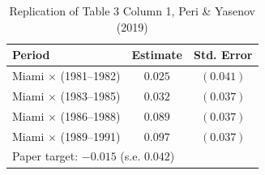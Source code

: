 \begin{table}[h]
\centering
\caption{Replication of Table 3 Column 1, Peri \& Yasenov (2019)}
\begin{tabular}{lcc}
\hline
Period & Estimate & Std. Error \\
\hline
Miami $\times$ (1981--1982) & $0.025$ & $(0.041)$ \\
Miami $\times$ (1983--1985) & $0.032$ & $(0.037)$ \\
Miami $\times$ (1986--1988) & $0.089$ & $(0.037)$ \\
Miami $\times$ (1989--1991) & $0.097$ & $(0.037)$ \\
\hline
\multicolumn{3}{l}{\footnotesize Paper target: $-0.015$ (s.e. $0.042$)} \\
\end{tabular}
\label{tab:main}
\end{table}
